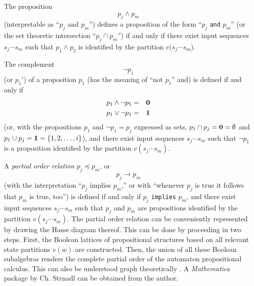 \documentclass{article}
\begin{document}
 The proposition
 \begin{equation}
 p_j\wedge p_m
 \end{equation}
 (interpretable as ``$p_j$ and $p_m$'')
  defines a
 proposition of the
  form ``$p_j$ {\tt and}
 $p_m$''
 (or the set theoretic intersection ``$p_j\cap p_m$'')
 if and only if
 there exist input sequences $s_{j}\cdots s_{m}$
 such that $p_1 \wedge p_2$ is
 identified by the partition $v(s_{j}\cdots s_{m}$).


 The complement
 \begin{equation}
 \neg p_1
 \end{equation}
 (or $p_1'$) of a proposition $p_1$
 (has the meaning of ``not $p_1$'' and)
 is defined if and only if
 \begin{eqnarray*}
 p_1\wedge \neg p_1 &=& {\bf 0}\\
 p_1\vee \neg p_1 &=& {\bf 1}
 \end{eqnarray*}
 (or, with the propositions $p_1$ and $\neg p_1=p_j$ expressed as
 sets,  $p_1\cap p_j={\bf 0}=\emptyset$ and
  $p_1\cup p_j={\bf 1}=\{1,2,\ldots ,i\}$),
 and
 there exist input sequences $s_{j}\cdots s_{m}$
 such that $\neg p_1$
 is a proposition identified by the partition $v(s_j\cdots s_m)$.

 A {\em partial order relation} $p_j\preceq p_m$, or
 \begin{equation}
 p_j\rightarrow p_m
 \end{equation}
 (with the interpretation ``$p_j $ implies $p_m$,'' or
 with  ``whenever $p_j$ is true it
 follows that $p_m$ is true, too'')
 is defined if and only if
 $p_j $ {\tt implies}
 $p_m$, and
 there exist input sequences $s_{j}\cdots s_{m}$
 such that $p_j$ and $p_m$ are
 propositions identified by the partition $v(s_{j}\cdots s_{m})$.
 The partial order relation can be conveniently represented by drawing
 the Hasse diagram thereof. This can be done by proceeding in two
 steps. First, the Boolean lattices of propositional structures based
 on all relevant state partitions $v(w)$ are constructed.
 Then, the union of
 all these Boolean subalgebras renders the complete partial order of
 the automaton propositional calculus. This can also be understood
 graph theoretically \cite{harary-69,ore-62}.
 A {\sl Mathematica}
 package by Ch. Strnadl \cite{strnadl-package}
 can be obtained from the author.
\end{document}
